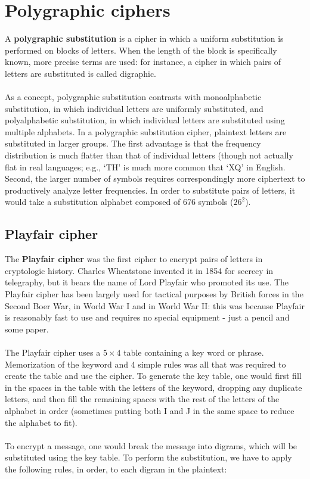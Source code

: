 \documentclass[Lau,binding=0.6cm,oneside]{sapthesis}
\begin{document}
\section{Polygraphic ciphers}
A \textbf{polygraphic substitution} is a cipher in which a uniform substitution is performed on blocks of letters. When the length of the block is specifically known, more precise terms are used: for instance, a cipher in which pairs of letters are substituted is called digraphic.\\\\
As a concept, polygraphic substitution contrasts with monoalphabetic substitution, in which individual letters are uniformly substituted, and polyalphabetic substitution, in which individual letters are substituted using multiple alphabets. In a polygraphic substitution cipher, plaintext letters are substituted in larger groups. The first advantage is that the frequency distribution is much flatter than that of individual letters (though not actually flat in real languages; e.g., `TH' is much more common that `XQ' in English. Second, the larger number of symbols requires correspondingly more ciphertext to productively analyze letter frequencies. In order to substitute pairs of letters, it would take a substitution alphabet composed of 676 symbols ($26^{2}$).

\subsection{Playfair cipher}
The \textbf{Playfair cipher} was the first cipher to encrypt pairs of letters in cryptologic history. Charles Wheatstone invented it in 1854 for secrecy in telegraphy, but it bears the name of Lord Playfair who promoted its use. The Playfair cipher has been largely used for tactical purposes by British forces in the Second Boer War, in World War I and in World War II: this was because Playfair is reasonably fast to use and requires no special equipment - just a pencil and some paper.\\\\
The Playfair cipher uses a $5 \times 4$ table containing a key word or phrase. Memorization of the keyword and 4 simple rules was all that was required to create the table and use the cipher. To generate the key table, one would first fill in the spaces in the table with the letters of the keyword, dropping any duplicate letters, and then fill the remaining spaces with the rest of the letters of the alphabet in order (sometimes putting both I and J in the same space to reduce the alphabet to fit).\\\\
To encrypt a message, one would break the message into digrams, which will be substituted using the key table. To perform the substitution, we have to apply the following rules, in order, to each digram in the plaintext:
\end{document}
